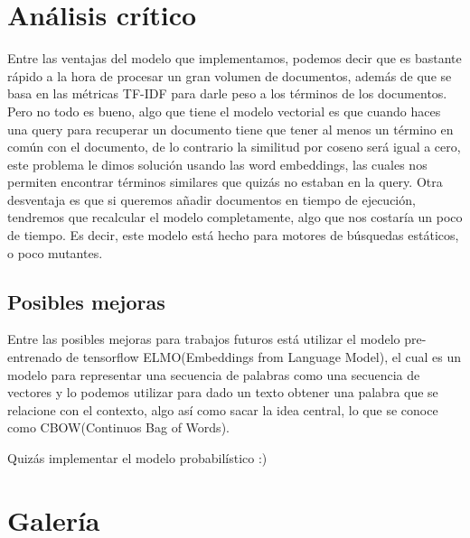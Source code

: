 \documentclass{llncs}
\begin{document}
\section{Análisis crítico}


Entre las ventajas del modelo que implementamos, podemos decir que es bastante rápido a la hora de procesar un gran volumen de documentos, además de que se basa en las métricas TF-IDF para darle peso a los términos de los documentos.  
Pero no todo es bueno, algo que tiene el modelo vectorial es que cuando haces una query para recuperar un documento tiene que tener al menos un término en común con el documento, de lo contrario la similitud por coseno será igual a cero, este problema le dimos solución usando las word embeddings, las cuales nos permiten encontrar términos similares que quizás no estaban en la query.  
Otra desventaja es que si queremos añadir documentos en tiempo de ejecución, tendremos que recalcular el modelo completamente, algo que nos costaría un poco de tiempo.  
Es decir, este modelo está hecho para motores de búsquedas estáticos, o poco mutantes.

\subsection{Posibles mejoras}

Entre las posibles mejoras para trabajos futuros está utilizar el modelo pre-entrenado de tensorflow ELMO(Embeddings from Language Model), el cual es un modelo para representar una secuencia de palabras como una secuencia de vectores y lo podemos utilizar para dado un texto obtener una palabra que se relacione con el contexto, algo así como sacar la idea central, lo que se conoce como CBOW(Continuos Bag of Words).

Quizás implementar el modelo probabilístico :)

\section{Galería}
\end{document}
